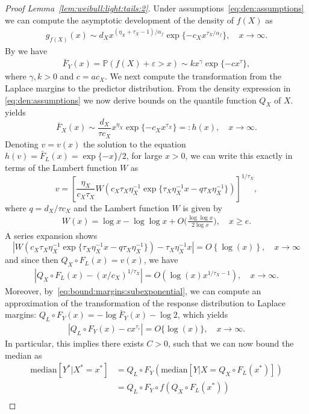 \documentclass{statsoc}
\theoremstyle{break}
\renewcommand{\P}{\mathbb P}
\def\M{\text{median}}
\newcommand{\beam}{\begin{eqnarray}}
\newcommand{\eeam}{\end{eqnarray}\noindent}
\begin{document}
\begin{proof}[Proof Lemma~\ref{lem:weibull:light:tails:2}] 
Under assumptions~\eqref{eq:den:assumptions} we can compute the asymptotic development of the density of $f(X)$ as
\beam \label{eq:comp:density:fx} 
g_{f(X)}(x) \sim d_X x^{ (\eta_X + \tau_X - 1)/\alpha_f } \exp\{ - c_X  x^{\tau_X/\alpha_f}\}, \quad x\to \infty.
\eeam  
By \citet[][Theorem 3.1]{asmussen:hashorva:laub:taimre:2017} we have
 \begin{align*}
	\bar F_Y(x) = \P(f(X) + \varepsilon > x) \sim k x^{\gamma} \exp\{ - c x^{\tau}\},
\end{align*}
where $\gamma, k >0$ and $c = a c_X$. We next compute the transformation from the Laplace margins to the predictor distribution. 
From the density expression in \eqref{eq:den:assumptions} we now derive bounds on the quantile function $Q_X$ of $X$. \citet[Equation 3.3]{asmussen:hashorva:laub:taimre:2017} yields 
\[
 \bar F_X(x) \sim \frac{d_X}{\tau c_X} x^{\eta_X}\exp\{-c_X x^{\tau_X}\} =:h(x), \quad x\to\infty.
\] 
Denoting $v = v(x)$ the solution to the equation $ h(v) = \bar F_L(x) = \exp\{-x\}/2$, for large $x>0$, we can write this exactly in terms of the Lambert function $W$ as 
\[
 	v = \left[  \frac{\eta_X}{c_X \tau_X } 
 		W\left( c_X \tau_X \eta_X^{-1}
 		\exp\{ \tau_X \eta_X^{-1} x  - q \tau_X \eta_X^{-1} \} \right) \right]^{1/\tau_X},
\]
where $q = d_X/\tau c_X$ and the Lambert function $W$ is given by
\beam \label{eq:inv:gaussian}
W(x) = \log x - \log \log x + O\Big(  \frac{ \log \log x}{ 2 \log x } \Big), \quad x \geq e.
\eeam 
A series expansion shows
\[
\left| W\left( c_X \tau_X \eta_X^{-1}
 		\exp\{ \tau_X \eta_X^{-1} x  - q \tau_X \eta_X^{-1} \} \right) - \tau_X \eta_X^{-1} x \right| = O\left\{\log(x)\right\}, \quad x\to\infty
\]
 and since then $Q_X \circ F_L(x) = v(x)$, we have
\beam \label{eq:qx:weibull2}
|Q_X \circ F_L(x)  - (x/c_X)^{1/\tau_X}| = O\left(\log(x) x^{1/\tau_X - 1} \right), \quad x \to \infty.
\eeam 
Moreover, by~\eqref{eq:bound:margins:subexponential}, we can compute an approximation of the transformation of the response distribution to Laplace margins: $ Q_L \circ F_Y(x) =  -\log \bar F_Y(x) - \log 2$, which yields
\beam \label{eq:fy:weibull2} 
|Q_L \circ F_Y(x) - c x^{\tau_\varepsilon} | = O\{\log(x)\}, \quad x \to \infty.  
\eeam 
In particular, this implies there exists $C > 0$, such that we can now bound the median as 
\begin{align*}
	\M[Y^* | X^* = x^*]  &= Q_L \circ F_Y( \M[Y | X = Q_X\circ F_L(x^*)] ) \\
		&= Q_L \circ F_Y \circ f(Q_X\circ F_L(x^*)) \\

\end{align*}
\end{proof}
\end{document}

